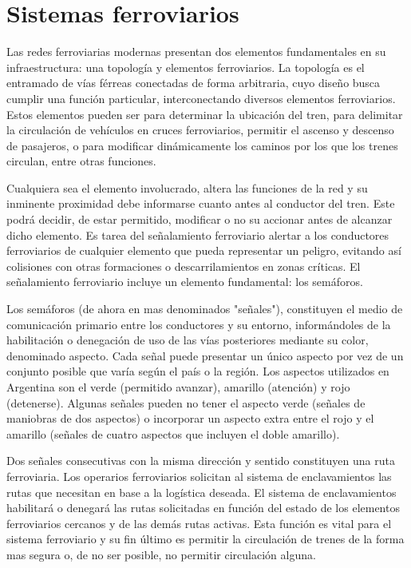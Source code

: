 


\section{Sistemas ferroviarios}

    Las redes ferroviarias modernas presentan dos elementos fundamentales en su infraestructura: una topología y elementos ferroviarios. La topología es el entramado de vías férreas conectadas de forma arbitraria, cuyo diseño busca cumplir una función particular, interconectando diversos elementos ferroviarios. Estos elementos pueden ser para determinar la ubicación del tren, para delimitar la circulación de vehículos en cruces ferroviarios, permitir el ascenso y descenso de pasajeros, o para modificar dinámicamente los caminos por los que los trenes circulan, entre otras funciones.

    Cualquiera sea el elemento involucrado, altera las funciones de la red y su inminente proximidad debe informarse cuanto antes al conductor del tren. Este podrá decidir, de estar permitido, modificar o no su accionar antes de alcanzar dicho elemento. Es tarea del señalamiento ferroviario alertar a los conductores ferroviarios de cualquier elemento que pueda representar un peligro, evitando así colisiones con otras formaciones o descarrilamientos en zonas críticas. El señalamiento ferroviario incluye un elemento fundamental: los semáforos.

    Los semáforos (de ahora en mas denominados "señales"), constituyen el medio de comunicación primario entre los conductores y su entorno, informándoles de la habilitación o denegación de uso de las vías posteriores mediante su color, denominado aspecto. Cada señal puede presentar un único aspecto por vez de un conjunto posible que varía según el país o la región. Los aspectos utilizados en Argentina son el verde (permitido avanzar), amarillo (atención) y rojo (detenerse). Algunas señales pueden no tener el aspecto verde (señales de maniobras de dos aspectos) o incorporar un aspecto extra entre el rojo y el amarillo (señales de cuatro aspectos que incluyen el doble amarillo).
    
    Dos señales consecutivas con la misma dirección y sentido constituyen una ruta ferroviaria. Los operarios ferroviarios solicitan al sistema de enclavamientos las rutas que necesitan en base a la logística deseada. El sistema de enclavamientos habilitará o denegará las rutas solicitadas en función del estado de los elementos ferroviarios cercanos y de las demás rutas activas. Esta función es vital para el sistema ferroviario y su fin último es permitir la circulación de trenes de la forma mas segura o, de no ser posible, no permitir circulación alguna.

